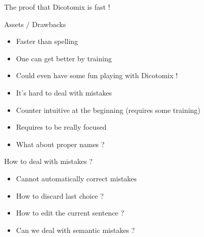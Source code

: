 \documentclass[graphics]{beamer}
\begin{document}
\begin{frame}{The proof that Dicotomix is fast !}
\end{frame}

\begin{frame}{Assets / Drawbacks}
	\begin{tcolorbox}[colback=green!5,colframe=green!40!black,title=Assets]
		\begin{itemize}
			\item Faster than spelling
			\item One can get better by training
			\item Could even have some fun playing with Dicotomix !
		\end{itemize}
	\end{tcolorbox}
	\pause
	\begin{tcolorbox}[colback=red!5,colframe=red!40!black,title=Drawbacks]
		\begin{itemize}
			\item It's hard to deal with mistakes
			\item Counter intuitive at the beginning (requires some training)
			\item Requires to be really focused
			\item What about proper names ?
		\end{itemize}
	\end{tcolorbox}
\end{frame}

\begin{frame}{How to deal with mistakes ?}
	\begin{itemize}
		\item Cannot automatically correct mistakes
		\pause
		\item How to discard last choice ?
		\pause
		\item How to edit the current sentence ?
		\pause
		\item Can we deal with semantic mistakes ?
	\end{itemize}
\end{frame}
\end{document}
